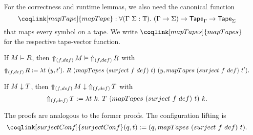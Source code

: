 %
For the correctness and runtime lemmas, we also need the canonical function
\[
  \coqlink[mapTape]{mapTape}:\forall (\Tau~\Sigma:\Type).~(\Tau\to\Sigma)\to\Tape_\Tau\to\Tape_\Sigma
\]
that maps every symbol on a tape.  We write $\coqlink[mapTapes]{mapTapes}$ for the respective tape-vector function.
%

\begin{lemma}
  \label{lem:LiftAlphabet_Realise}
  If $M \Realise R$, then $\LiftAlphabet{M}{(f,def)} \Realise \LiftAlphabet{R}{(f,def)}$ with
  \small
  \[
    \LiftAlphabet{R}{(f,def)} := \lambda t~(y, t').~R~(mapTapes~(surject~f~def)~t)~(y, mapTapes~(surject~f~def)~t').
  \]
\end{lemma}

\begin{lemma}
  \label{lem:LiftAlphabet_TerminatesIn}
  If $M \TerminatesIn T$, then $\LiftAlphabet{M}{(f,def)} \TerminatesIn \LiftAlphabet{T}{(f,def)}$ with
  \[
    \LiftAlphabet{T}{(f,def)} := \lambda t~k.~T~(mapTapes~(surject~f~def)~t)~k.
  \]
\end{lemma}

The proofs are analogous to the former proofs.  The configuration lifting is
\[
  \coqlink[surjectConf]{surjectConf} (q,t) := (q, mapTapes~(surject~f~def)~t).
\]




